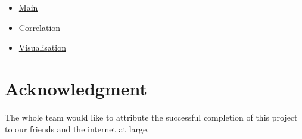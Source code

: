 \documentclass[conference]{IEEEtran}
\begin{document}
\begin{itemize}
\color{blue}
\item \href{https://github.com/0thorderlogic/smalldata/blob/main/main.ipynb}{Main}
\item \href{https://github.com/0thorderlogic/smalldata/blob/main/correlation.ipynb}{Correlation}
\item \href{https://github.com/0thorderlogic/smalldata/blob/main/visuals.ipynb}{Visualisation}
\end{itemize}


\section{Acknowledgment}

The whole team would like to attribute the successful completion of this project to our friends and the internet at large.

\section*{}
\end{document}
